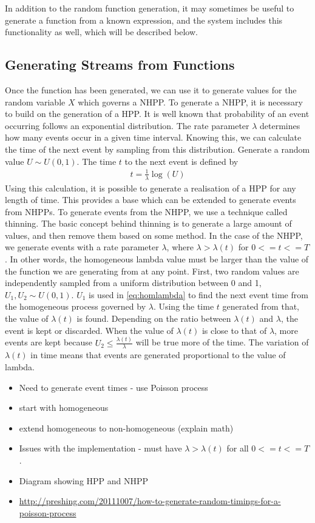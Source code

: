 \documentclass[a4paper,11pt]{article}
\begin{document}
In addition to the random function generation, it may sometimes be useful to
generate a function from a known expression, and the system includes this
functionality as well, which will be described below.
\subsection{Generating Streams from Functions}
\label{sec-3-2}

   Once the function has been generated, we can use it to generate values for
   the random variable $X$ which governs a NHPP. To generate a NHPP, it is
   necessary to build on the generation of a HPP. It is well known that
   probability of an event occurring follows an exponential distribution. The
   rate parameter $\lambda$ determines how many events occur in a given time
   interval. Knowing this, we can calculate the time of the next event by
   sampling from this distribution. Generate a random value $U\sim U(0,1)$. The
   time $t$ to the next event is defined by
   \begin{align}\label{eq:homlambda}
   t=\frac{1}{\lambda}\log(U)
   \end{align}
   Using this calculation, it is possible to generate a realisation of a HPP for
   any length of time. This provides a base which can be extended to generate
   events from NHPPs. To generate events from the NHPP, we use a technique
   called thinning. The basic concept behind thinning is to generate a large
   amount of values, and then remove them based on some method. In the case of
   the NHPP, we generate events with a rate parameter $\lambda$, where
   $\lambda>\lambda(t)$ for $0<=t<=T$. In other words, the homogeneous lambda
   value must be larger than the value of the function we are generating from at
   any point. First, two random values are independently sampled from a uniform
   distribution between 0 and 1, $U_1,U_2\sim U(0,1)$. $U_1$ is used in
   \eqref{eq:homlambda} to find the next event time from the homogeneous process
   governed by $\lambda$. Using the time $t$ generated from that, the value of
   $\lambda(t)$ is found. Depending on the ratio between $\lambda(t)$ and
   $\lambda$, the event is kept or discarded. When the value of $\lambda(t)$ is
   close to that of $\lambda$, more events are kept because
   $U_2\leq\frac{\lambda(t)}{\lambda}$ will be true more of the time. The
   variation of $\lambda(t)$ in time means that events are generated
   proportional to the value of lambda.

\begin{itemize}
\item Need to generate event times - use Poisson process
\item start with homogeneous
\item extend homogeneous to non-homogeneous (explain math)
\item Issues with the implementation - must have $\lambda>\lambda(t)$ for all
  $0<=t<=T$.
\item Diagram showing HPP and NHPP
\item \href{http://preshing.com/20111007/how-to-generate-random-timings-for-a-poisson-process}{http://preshing.com/20111007/how-to-generate-random-timings-for-a-poisson-process}
\end{itemize}
\end{document}
